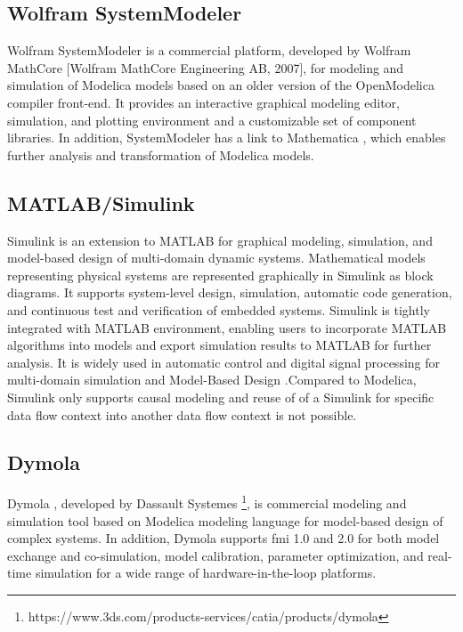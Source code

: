 \subsection{Wolfram SystemModeler}
\label{sec:wolfram}

Wolfram SystemModeler \cite{wolfram, wolframmats, wolframpeter} is a commercial platform, developed by Wolfram MathCore [Wolfram MathCore Engineering AB, 2007], for modeling and simulation of Modelica models based on an older version of the OpenModelica compiler front-end. It provides an interactive graphical modeling editor, simulation, and plotting environment and a customizable set of component libraries. In addition, SystemModeler has a link to Mathematica \cite{mathematica}, which enables further analysis and transformation of Modelica models.

\subsection{MATLAB/Simulink}
\label{sec:simulink}

Simulink \cite{simulink} is an extension to MATLAB for graphical modeling, simulation, and model-based design of multi-domain dynamic systems. Mathematical models representing physical systems are represented graphically in Simulink as block diagrams. It supports system-level design, simulation, automatic code generation, and continuous test and verification of embedded systems.
Simulink is tightly integrated with MATLAB environment, enabling users to incorporate MATLAB algorithms into models and export simulation results to MATLAB for further analysis. It is widely used in automatic control and digital signal processing for multi-domain simulation and Model-Based Design \cite{simulinkchristian,simulinkreedy}.Compared to Modelica, Simulink only supports causal modeling and reuse of of a Simulink for specific data flow context into another data flow context is not possible.

\subsection{Dymola}
\label{sec:dymola}

Dymola \cite{dymola,dymoladag}, developed by Dassault Systemes \footnote{https://www.3ds.com/products-services/catia/products/dymola}, is commercial modeling and simulation tool based on Modelica modeling language for model-based design of complex systems. In addition, Dymola supports \acrshort{fmi} 1.0 and 2.0 for both model exchange and co-simulation, model calibration, parameter optimization, and real-time simulation for a wide range of hardware-in-the-loop platforms.

